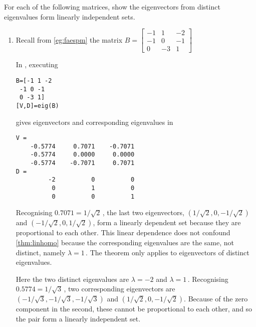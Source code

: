 \begin{example} \label{eg:indepev}
For each of the following matrices, show the eigenvectors from distinct eigenvalues form linearly independent sets.
\begin{enumerate}
\item  Recall from \autoref{eg:faespm} the matrix \(B=\begin{bmatrix}-1&1&-2
\\-1&0&-1
\\0&-3&1 \end{bmatrix}\)
\begin{solution} 
In \script, executing 
\begin{verbatim}
B=[-1 1 -2
 -1 0 -1
 0 -3 1]
[V,D]=eig(B)
\end{verbatim}
\setbox\ajrqrbox\hbox{}%
\marginpar{\usebox{\ajrqrbox}}%
gives eigenvectors and corresponding eigenvalues in
\begin{verbatim}
V =
    -0.5774     0.7071    -0.7071
    -0.5774     0.0000     0.0000
    -0.5774    -0.7071     0.7071
D =
         -2          0          0
          0          1          0
          0          0          1
\end{verbatim} 
Recognising \(0.7071=1/\sqrt2\)\,, the last two eigenvectors, \((1/\sqrt2,0,-1/\sqrt2)\) and  \((-1/\sqrt2,0,1/\sqrt2)\), form a linearly dependent set because they are proportional to each other.
This linear dependence does not confound  \autoref{thm:linhomo} because the corresponding eigenvalues are the same, not distinct, namely \(\lambda=1\)\,.
The theorem only applies to eigenvectors of distinct eigenvalues.

Here the two distinct eigenvalues are \(\lambda=-2\) and \(\lambda=1\)\,.
Recognising \(0.5774=1/\sqrt3\)\,, two corresponding eigenvectors are \((-1/\sqrt3,-1/\sqrt3,-1/\sqrt3)\) and \((1/\sqrt2,0,-1/\sqrt2)\).
Because of the zero component in the second, these cannot be proportional to each other, and so the pair form a linearly independent set.
\end{solution}



\end{enumerate}
\end{example}
